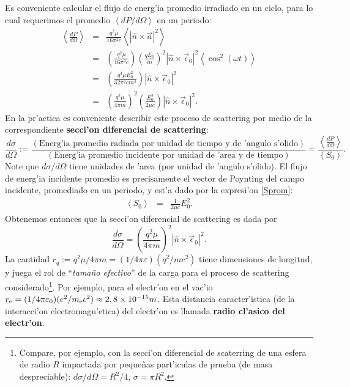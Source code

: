 Es conveniente calcular el flujo de energ'ia promedio irradiado en un ciclo,
para lo cual requerimos el promedio $\left\langle
{dP}/{d\Omega}\right\rangle$ en un periodo:
\begin{eqnarray}
\left\langle\frac{dP}{d\Omega}\right\rangle  &=&
\frac{q^2\mu}{16\pi^2 c}\left\langle |\hat{n}\times\vec{a}|^2\right\rangle \\
&=&\left(\frac{q^2\mu}{16\pi^2 c}\right)\left(\frac{qE_0}{m}\right)^2\left|
\hat{n}\times\vec{\epsilon}_0\right|^2\left\langle
\cos^2(\omega t)\right\rangle \\
&=&\left(\frac{q^4\mu E_0^2}{32\pi^2 c m^2}\right)\left|
\hat{n}\times\vec{\epsilon}_0\right|^2\\
&=&\left(\frac{q^2\mu}{4\pi m}\right)^2\left(\frac{E_0^2}{2\mu c}\right) \left|
\hat{n}\times\vec{\epsilon}_0\right|^2.
\end{eqnarray}
En la pr'actica es conveniente describir este proceso de scattering por medio de
la correspondiente  \textbf{secci'on diferencial de scattering}:
\begin{equation}
\frac{d\sigma}{d\Omega}:=\frac{\left( \text{Energ'ia promedio radiada por unidad
de tiempo y de 'angulo s'olido}\right) }{\left( \text{Energ'ia promedio
incidente por unidad de 'area y de tiempo}\right) }=\frac{\left\langle
\frac{dP}{d\Omega}\right\rangle}{\left\langle S_0\right\rangle}.
\end{equation}
Note que ${d\sigma}/{d\Omega}$ tiene unidades de 'area (por unidad de 'angulo
s'olido).
El flujo de energ'ia incidente promedio es precisamente el vector de Poynting
del campo incidente, promediado en un periodo, y est'a dado por la expresi'on \eqref{Sprom}:
\begin{eqnarray}
\left\langle S_0\right\rangle &=&\frac{1}{2\mu c}E_0^2.
\end{eqnarray}
Obtenemos entonces que la secci'on diferencial de scattering es dada por
\begin{equation}
\boxed{\frac{d\sigma}{d\Omega}  =\left(\frac{q^2\mu}{4\pi m}\right)^2\left|
\hat{n}\times\vec{\epsilon}_0\right|^2 .}\label{seeT}
\end{equation}
La cantidad $r_q:={q^2\mu}/{4\pi m}=(1/{4\pi\varepsilon})({q^2}/{mc^2})$ tiene dimensiones de longitud, y juega el rol de ``\textit{tamaño efectivo}'' de la carga para el proceso de scattering considerado\footnote{Compare, por ejemplo, con la secci'on diferencial de scaterring de una esfera de radio $R$ impactada por pequeñas part'iculas de prueba (de masa despreciable): $d\sigma/d\Omega=R^2/4$, $\sigma=\pi R^2$.}. Por ejemplo, para el electr'on en el vac'io $r_{\rm e}=(1/{4\pi\varepsilon_0})({e^2}/{m_{\rm e}c^2})\approx 2,8\times 10^{-15}m$. Esta distancia caracter'istica (de la interacci'on electromagn'etica) del electr'on es llamada \textbf{radio cl'asico del electr'on}.

